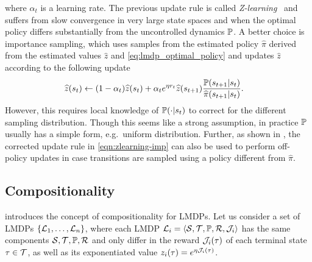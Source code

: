 where $\alpha_t$ is a learning rate. 
The previous update rule is called \emph{Z-learning}~\citep{Todorov2006} and suffers from slow convergence in very large state spaces and when the optimal policy differs substantially from the uncontrolled dynamics $\mathbb{P}$.
A better choice is importance sampling, which uses samples from the estimated policy $\widehat{\pi}$ derived from the estimated values $\widehat{z}$ and \eqref{eq:lmdp_optimal_policy} and updates $\widehat{z}$ according to the following update
\begin{align}\label{eqn:zlearning-imp}
\widehat{z}(s_t) \gets (1-\alpha_t)& \widehat{z}(s_t) + \alpha_t e^{\eta r_t}\widehat{z}(s_{t+1})\frac {\mathbb{P}(s_{t+1}|s_t)} {\widehat{\pi}(s_{t+1}|s_t)}.
\end{align}
However, this requires local knowledge of $\mathbb{P}(\cdot|s_t)$ to correct for the different sampling distribution.
Though this seems like a strong assumption, in practice $\mathbb{P}$ usually has a simple form, e.g.~uniform distribution.
Further, as shown in \citet{Jonsson2016}, the corrected update rule in \eqref{eqn:zlearning-imp} can also be used to perform off-policy updates in case transitions are sampled using a policy different from $\widehat{\pi}$.

\subsection{Compositionality}
\label{section:compositionality}
\citet{Todorov2009a} introduces the concept of compositionality for LMDPs. Let us consider a set of LMDPs $\{\mathcal{L}_1,\ldots,\mathcal{L}_n\}$, where each LMDP $\mathcal{L}_i=\langle\mathcal{S},\mathcal{T},\mathbb{P},\mathcal{R},\mathcal{J}_i\rangle$ has the same components $\mathcal{S},\mathcal{T},\mathbb{P},\mathcal{R}$ and only differ in the reward $\mathcal{J}_i(\tau)$ of each terminal state $\tau\in\mathcal{T}$, as well as its exponentiated value $z_i(\tau)=e^{\eta \mathcal{J}_i(\tau)}$.

